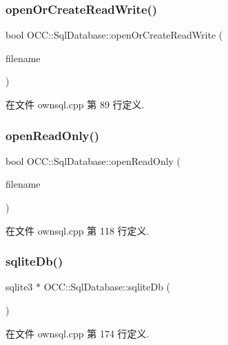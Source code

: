\subsubsection{\texorpdfstring{open\+Or\+Create\+Read\+Write()}{openOrCreateReadWrite()}}
{\footnotesize\ttfamily bool O\+C\+C\+::\+Sql\+Database\+::open\+Or\+Create\+Read\+Write (\begin{DoxyParamCaption}\item[{const Q\+String \&}]{filename }\end{DoxyParamCaption})}



在文件 ownsql.\+cpp 第 89 行定义.

\mbox{\label{class_o_c_c_1_1_sql_database_a372f988d2b4a9d2be460e2b80d9fca94}} 
\subsubsection{\texorpdfstring{open\+Read\+Only()}{openReadOnly()}}
{\footnotesize\ttfamily bool O\+C\+C\+::\+Sql\+Database\+::open\+Read\+Only (\begin{DoxyParamCaption}\item[{const Q\+String \&}]{filename }\end{DoxyParamCaption})}



在文件 ownsql.\+cpp 第 118 行定义.

\mbox{\label{class_o_c_c_1_1_sql_database_a5123d8afeb0c8efa2c538fdfd125b4b4}} 
\subsubsection{\texorpdfstring{sqlite\+Db()}{sqliteDb()}}
{\footnotesize\ttfamily sqlite3 $\ast$ O\+C\+C\+::\+Sql\+Database\+::sqlite\+Db (\begin{DoxyParamCaption}{ }\end{DoxyParamCaption})}



在文件 ownsql.\+cpp 第 174 行定义.

